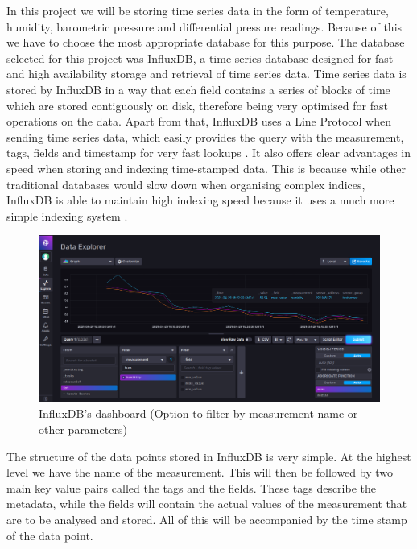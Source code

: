 \documentclass[12pt]{article}
\begin{document}
In this project we will be storing time series data in the form of temperature, humidity, barometric pressure and differential pressure readings. Because of this we have to choose the most appropriate database for this purpose. The database selected for this project was InfluxDB, a time series database designed for fast and high availability storage and retrieval of time series data. Time series data is stored by InfluxDB in a way that each field contains a series of blocks of time which are stored contiguously on disk, therefore being very optimised for fast operations on the data. Apart from that, InfluxDB uses a Line Protocol when sending time series data, which easily provides the query with the measurement, tags, fields and timestamp for very fast lookups \cite{influx:time-series}. It also offers clear advantages in speed when storing and indexing time-stamped data. This is because while other traditional databases would slow down when organising complex indices, InfluxDB is able to maintain high indexing speed because it uses a much more simple indexing system \cite{ionos}. \par

\begin{figure}[h]
\includegraphics[scale=0.35]{influx-dashboard}
\centering
\caption{InfluxDB's dashboard (Option to filter by measurement name or other parameters)}
\label{fig:influx-dashboard}
\end{figure}

The structure of the data points stored in InfluxDB is very simple. At the highest level we have the name of the measurement. This will then be followed by two main key value pairs called the tags and the fields. These tags describe the metadata, while the fields will contain the actual values of the measurement that are to be analysed and stored. All of this will be accompanied by the time stamp of the data point. \par
\end{document}
